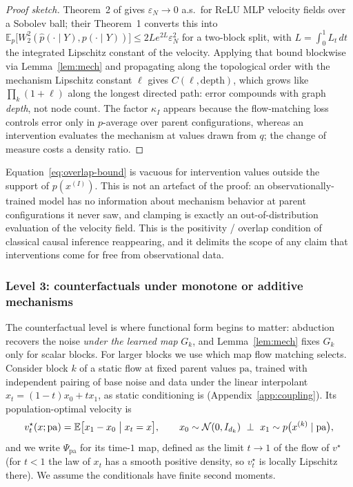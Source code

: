 \begin{proof}[Proof sketch]
Theorem~2 of \citet{jeong_conditional_2025} gives $\varepsilon_N \to 0$ a.s.\ for ReLU MLP
velocity fields over a Sobolev ball; their Theorem~1 converts this into
$\mathbb{E}_{p}\bigl[W_2^2(\hat p(\cdot\mid Y), p(\cdot \mid Y))\bigr] \le
2Le^{2L}\varepsilon_N^2$ for a two-block split, with $L=\int_0^1 L_t\,dt$ the integrated
Lipschitz constant of the velocity. Applying that bound blockwise via Lemma~\ref{lem:mech}
and propagating along the topological order with the mechanism Lipschitz constant $\ell$
gives $C(\ell,\mathrm{depth})$, which grows like $\prod_k(1+\ell)$ along the longest directed
path: error compounds with graph \emph{depth}, not node count. The factor $\kappa_I$ appears
because the flow-matching loss controls error only in $p$-average over parent configurations,
whereas an intervention evaluates the mechanism at values drawn from $q$; the change of
measure costs a density ratio.
\end{proof}

\begin{remark}
\label{rem:overlap}
Equation~\eqref{eq:overlap-bound} is vacuous for intervention values outside the support of
$p(x^{(I)})$. This is not an artefact of the proof: an observationally-trained model has no
information about mechanism behavior at parent configurations it never saw, and clamping is
exactly an out-of-distribution evaluation of the velocity field. This is the positivity /
overlap condition of classical causal inference reappearing, and it delimits the scope of any
claim that interventions come for free from observational data.
\end{remark}

\subsubsection{Level 3: counterfactuals under monotone or additive mechanisms}

The counterfactual level is where functional form begins to matter: abduction recovers the
noise \emph{under the learned map} $G_k$, and Lemma~\ref{lem:mech} fixes $G_k$ only for
scalar blocks. For larger blocks we use which map flow matching selects. Consider block $k$
of a static flow at fixed parent values $\mathrm{pa}$, trained with independent pairing of
base noise and data under the linear interpolant $x_t = (1-t)x_0 + t x_1$, as static
conditioning is (Appendix~\ref{app:coupling}). Its population-optimal velocity is
\begin{equation}
\label{eq:fm-opt}
  v^\star_t(x;\mathrm{pa}) = \mathbb{E}\bigl[x_1 - x_0 \bigm| x_t = x\bigr],
  \qquad x_0 \sim \mathcal{N}(0, I_{d_k}) \ \perp\ x_1 \sim p\bigl(x^{(k)} \mid \mathrm{pa}\bigr),
\end{equation}
and we write $\Psi_{\mathrm{pa}}$ for its time-$1$ map, defined as the limit $t \to 1$ of the
flow of $v^\star$ (for $t < 1$ the law of $x_t$ has a smooth positive density, so $v^\star_t$ is
locally Lipschitz there). We assume the conditionals have finite second moments.

